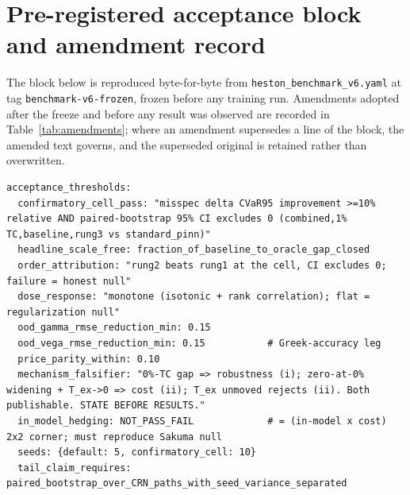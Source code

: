 \documentclass[10pt]{article}
\begin{document}
\appendix
\section{Pre-registered acceptance block and amendment record}
\label{app:thresholds}
The block below is reproduced byte-for-byte from
\texttt{heston\_benchmark\_v6.yaml} at tag \texttt{benchmark-v6-frozen}, frozen
before any training run. Amendments adopted after the freeze and before any result
was observed are recorded in Table~\ref{tab:amendments}; where an amendment
supersedes a line of the block, the amended text governs, and the superseded
original is retained rather than overwritten.

\begin{lstlisting}[basicstyle=\ttfamily\tiny,breaklines=true,breakatwhitespace=true,keepspaces=true,columns=fullflexible,postbreak=\mbox{$\hookrightarrow$\space},breakindent=1.5em]
acceptance_thresholds:
  confirmatory_cell_pass: "misspec delta CVaR95 improvement >=10% relative AND paired-bootstrap 95% CI excludes 0 (combined,1% TC,baseline,rung3 vs standard_pinn)"
  headline_scale_free: fraction_of_baseline_to_oracle_gap_closed
  order_attribution: "rung2 beats rung1 at the cell, CI excludes 0; failure = honest null"
  dose_response: "monotone (isotonic + rank correlation); flat = regularization null"
  ood_gamma_rmse_reduction_min: 0.15
  ood_vega_rmse_reduction_min: 0.15           # Greek-accuracy leg
  price_parity_within: 0.10
  mechanism_falsifier: "0%-TC gap => robustness (i); zero-at-0% widening + T_ex->0 => cost (ii); T_ex unmoved rejects (ii). Both publishable. STATE BEFORE RESULTS."
  in_model_hedging: NOT_PASS_FAIL             # = (in-model x cost) 2x2 corner; must reproduce Sakuma null
  seeds: {default: 5, confirmatory_cell: 10}
  tail_claim_requires: paired_bootstrap_over_CRN_paths_with_seed_variance_separated
\end{lstlisting}
\end{document}
